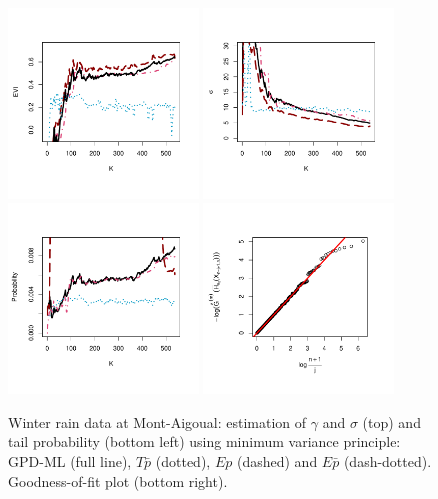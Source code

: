 \begin{figure}[!ht]
 \centering
\includegraphics[width=0.45\textwidth]{./plots/paper3/winter_evi.pdf} 
\includegraphics[width=0.45\textwidth]{./plots/paper3/winter_sigma.pdf} \\
\includegraphics[width=0.45\textwidth]{./plots/paper3/winter_prob.pdf}
\includegraphics[width=0.45\textwidth]{./plots/paper3/winter_GoF.pdf}
 
 \caption{Winter rain data at Mont-Aigoual: estimation of $\gamma$ and $\sigma$ (top) and tail probability (bottom left) using minimum variance principle: GPD-ML (full line), $T\bar{p}$ (dotted), $Ep$ (dashed) and $E\bar{p}$ (dash-dotted). Goodness-of-fit plot (bottom right). }
\label{paper3:fig11}
\end{figure} 

